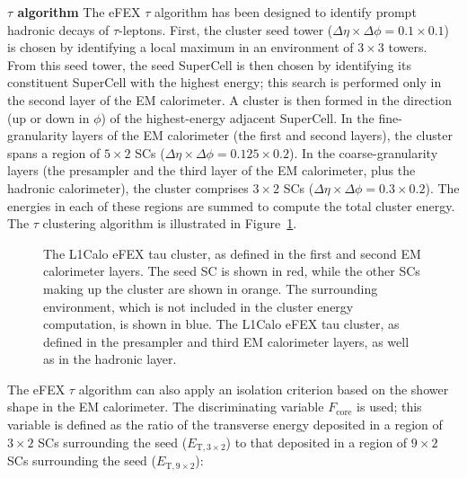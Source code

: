 \documentclass[cernpreprint, atlasdraft=false, UKenglish,british,orcidlogo, texmf, orcidlogo]{atlasdoc}
\begin{document}
 
\textbf{$\tau$ algorithm} The \gls{eFEX} $\tau$ algorithm has been designed to identify prompt hadronic decays of $\tau$-leptons.
First, the cluster seed tower ($\Delta\eta \times \Delta\phi = 0.1 \times 0.1$) is chosen by identifying a local maximum in an environment of $3 \times 3$ towers.
From this seed tower, the seed SuperCell is then chosen by identifying its constituent SuperCell with the highest energy; this search is performed only in the second layer of the \gls{EM} calorimeter.
A cluster is then formed in the direction (up or down in $\phi$) of the highest-energy adjacent SuperCell.  In the fine-granularity layers of the \gls{EM} calorimeter (the first and second layers), the cluster spans a region of $5 \times 2$ \glspl{SC} ($\Delta\eta \times \Delta\phi = 0.125 \times 0.2$).
In the coarse-granularity layers (the presampler and the third layer of the \gls{EM} calorimeter, plus the hadronic calorimeter), the cluster comprises $3 \times 2$ \glspl{SC} ($\Delta\eta \times \Delta\phi = 0.3 \times 0.2$).  The energies in each of these regions are summed to compute the total cluster energy.
The $\tau$ clustering algorithm is illustrated in Figure~\ref{fig:TDAQL1CaloeFEXTau}.
 
 
\begin{figure}[htbp]
\centering
{}
\caption{
\protect{} The \gls{L1Calo} \gls{eFEX} tau cluster, as defined in the first and second \gls{EM} calorimeter layers.  The seed \gls{SC} is shown in red, while the other \glspl{SC} making up the cluster are shown in orange.  The surrounding environment, which is not included in the cluster energy computation, is shown in blue.
\protect{} The \gls{L1Calo} \gls{eFEX} tau cluster, as defined in the presampler and third \gls{EM} calorimeter layers, as well as in the hadronic layer.
}
\label{fig:TDAQL1CaloeFEXTau}
\end{figure}
 
 
The \gls{eFEX} $\tau$ algorithm can also apply an isolation criterion based on the shower shape in the \gls{EM} calorimeter.  The discriminating variable $F_{\mathrm{core}}$ is used; this variable is defined as the ratio of the transverse energy deposited in a region of $3 \times 2$ \glspl{SC} surrounding the seed ($E_{\mathrm{T}, 3\times2}$) to that deposited in a region of $9 \times 2$ \glspl{SC} surrounding the seed ($E_{\mathrm{T}, 9\times2}$):
 
\end{document}
